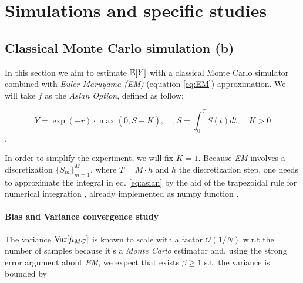 \section{Simulations and specific studies}

\subsection{Classical Monte Carlo simulation (b)} \label{sec:b}

In this section we aim to estimate $\mathbb{E}[Y]$ with a classical Monte Carlo simulator combined with \textit{Euler Maruyama (EM)} (equation \ref{eq:EM}) approximation.
We will take $f$ as the \textit{Asian Option}, defined as follow:

\begin{equation}\label{eq:asian}
Y = \exp(-r) \cdot \max(0, \bar{S} - K), \quad, \bar{S} = \int_0^T S(t) dt, \quad K > 0 
\end{equation}.

In order to simplify the experiment, we will fix $K = 1$.
Because \textit{EM} involves a discretization $\{S_m\}_{m=1}^M$, where $T = M \cdot h$ and $h$ the discretization step, one needs to approximate the integral in eq. \ref{eq:asian} by the aid of the trapezoidal rule for numerical integration , already implemented as numpy function \cite{trapz}.

\paragraph{Bias and Variance convergence study}

The variance $\text{Var}[\hat{\mu}_{MC}]$ is known to scale with a factor $\mathcal{O}(1/N)$ w.r.t the number of samples because it's a \textit{Monte Carlo} estimator and, using the strong error argument about \textit{EM}, we expect
that exists $\beta \ge 1$ s.t. the variance is bounded by


